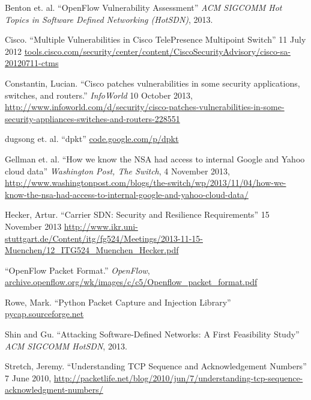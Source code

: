\begin{thebibliography}{99}

 Benton et. al. ``OpenFlow Vulnerability Assessment'' \emph{ACM SIGCOMM Hot Topics in Software Defined Networking (HotSDN)}, 2013. 

 Cisco. ``Multiple Vulnerabilities in Cisco TelePresence Multipoint Switch'' 11 July 2012 \url{tools.cisco.com/security/center/content/CiscoSecurityAdvisory/cisco-sa-20120711-ctms}

 Constantin, Lucian. ``Cisco patches vulnerabilities in some security applications, switches, and routers.'' \emph{InfoWorld} 10 October 2013, \url{http://www.infoworld.com/d/security/cisco-patches-vulnerabilities-in-some-security-appliances-switches-and-routers-228551}

 dugsong et. al. ``dpkt'' \url{code.google.com/p/dpkt}

 Gellman et. al. ``How we know the NSA had access to internal Google and Yahoo cloud data'' \emph{Washington Post, The Switch}, 4 November 2013, \url{http://www.washingtonpost.com/blogs/the-switch/wp/2013/11/04/how-we-know-the-nsa-had-access-to-internal-google-and-yahoo-cloud-data/}

 Hecker, Artur. ``Carrier SDN: Security and Resilience Requirements'' 15 November 2013 \url{http://www.ikr.uni-stuttgart.de/Content/itg/fg524/Meetings/2013-11-15-Muenchen/12_ITG524_Muenchen_Hecker.pdf}

 ``OpenFlow Packet Format.'' \emph{OpenFlow}, \url{archive.openflow.org/wk/images/c/c5/Openflow_packet_format.pdf}

 Rowe, Mark. ``Python Packet Capture and Injection Library'' \url{pycap.sourceforge.net}

 Shin and Gu. ``Attacking Software-Defined Networks: A First Feasibility Study'' \emph{ACM SIGCOMM HotSDN}, 2013.

 Stretch, Jeremy. ``Understanding TCP Sequence and Acknowledgement Numbers'' 7 June 2010, \url{http://packetlife.net/blog/2010/jun/7/understanding-tcp-sequence-acknowledgment-numbers/}

\end{thebibliography}
